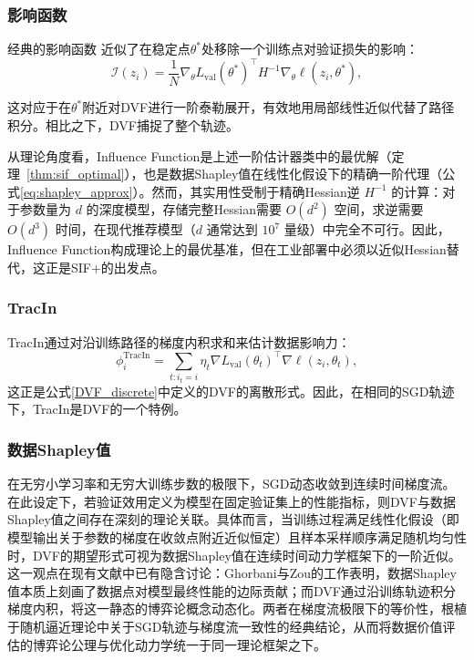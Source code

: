 \documentclass[12pt,a4paper]{ctexart}
\theoremstyle{definition}
\theoremstyle{plain}
\begin{document}
\subsubsection{影响函数}
经典的影响函数 \cite{influence} 近似了在稳定点\(\theta^*\)处移除一个训练点对验证损失的影响：
\[
\mathcal{I}(z_i) = \frac{1}{N} \nabla_{\theta} L_{\text{val}}(\theta^*)^{\top} H^{-1} \nabla_{\theta} \ell(z_i, \theta^*),
\]

这对应于在\(\theta^*\)附近对DVF进行一阶泰勒展开，有效地用局部线性近似代替了路径积分。相比之下，DVF捕捉了整个轨迹。

从理论角度看，Influence Function是上述一阶估计器类中的最优解（定理~\ref{thm:sif_optimal}），也是数据Shapley值在线性化假设下的精确一阶代理（公式\eqref{eq:shapley_approx}）。然而，其实用性受制于精确Hessian逆 $H^{-1}$ 的计算：对于参数量为 $d$ 的深度模型，存储完整Hessian需要 $O(d^2)$ 空间，求逆需要 $O(d^3)$ 时间，在现代推荐模型（$d$ 通常达到 $10^7$ 量级）中完全不可行。因此，Influence Function构成理论上的最优基准，但在工业部署中必须以近似Hessian替代，这正是SIF+的出发点。

\subsubsection{TracIn}
TracIn\cite{TracIn}通过对沿训练路径的梯度内积求和来估计数据影响力：
\[
\phi_i^{\text{TracIn}} = \sum_{t: i_t = i} \eta_t \nabla L_{\text{val}}(\theta_t)^{\top} \nabla \ell(z_i, \theta_t),
\]
这正是公式\eqref{DVF_discrete}中定义的DVF的离散形式。因此，在相同的SGD轨迹下，TracIn是DVF的一个特例。

\subsubsection{数据Shapley值}
在无穷小学习率和无穷大训练步数的极限下，SGD动态收敛到连续时间梯度流\cite{StochasticApproximation}。在此设定下，若验证效用定义为模型在固定验证集上的性能指标，则DVF与数据Shapley值之间存在深刻的理论关联。具体而言，当训练过程满足线性化假设（即模型输出关于参数的梯度在收敛点附近近似恒定）且样本采样顺序满足随机均匀性时，DVF的期望形式可视为数据Shapley值在连续时间动力学框架下的一阶近似。这一观点在现有文献中已有隐含讨论\cite{ghorbani2019data}：Ghorbani与Zou的工作表明，数据Shapley值本质上刻画了数据点对模型最终性能的边际贡献；而DVF通过沿训练轨迹积分梯度内积，将这一静态的博弈论概念动态化。两者在梯度流极限下的等价性，根植于随机逼近理论中关于SGD轨迹与梯度流一致性的经典结论\cite{StochasticApproximation}，从而将数据价值评估的博弈论公理与优化动力学统一于同一理论框架之下。
\end{document}
